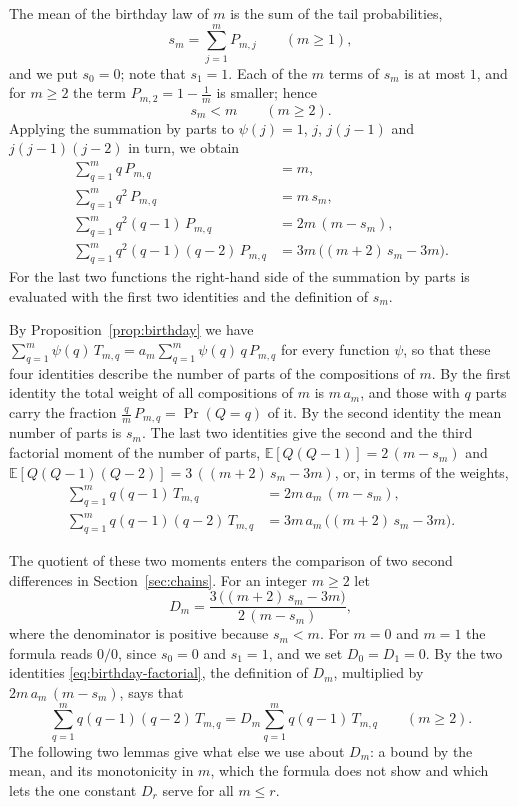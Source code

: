 \documentclass{amsart}
\theoremstyle{definition}
\theoremstyle{remark}
\numberwithin{equation}{section}
\begin{document}
The mean of the birthday law of $m$ is the sum of the tail probabilities,
\[
s_m=\sum_{j=1}^{m}P_{m,j}\qquad(m\ge 1),
\]
and we put $s_0=0$; note that $s_1=1$. Each of the $m$ terms of $s_m$ is at most $1$, and for $m\ge 2$ the term $P_{m,2}=1-\frac1m$ is smaller; hence
\[
s_m<m\qquad(m\ge 2).
\]
Applying the summation by parts to $\psi(j)=1$, $j$, $j(j-1)$ and $j(j-1)(j-2)$ in turn, we obtain
\begin{equation}\label{eq:birthday-moments}
\begin{aligned}
\sum_{q=1}^{m}q\,P_{m,q}&=m,\\
\sum_{q=1}^{m}q^{2}\,P_{m,q}&=m\,s_m,\\
\sum_{q=1}^{m}q^{2}(q-1)\,P_{m,q}&=2m\,(m-s_m),\\
\sum_{q=1}^{m}q^{2}(q-1)(q-2)\,P_{m,q}&=3m\,\bigl((m+2)\,s_m-3m\bigr).
\end{aligned}
\end{equation}
For the last two functions the right-hand side of the summation by parts is evaluated with the first two identities and the definition of $s_m$.

By Proposition~\ref{prop:birthday} we have $\sum_{q=1}^{m}\psi(q)\,T_{m,q}=a_m\sum_{q=1}^{m}\psi(q)\,q\,P_{m,q}$ for every function $\psi$, so that these four identities describe the number of parts of the compositions of $m$. By the first identity the total weight of all compositions of $m$ is $m\,a_m$, and those with $q$ parts carry the fraction $\frac qm\,P_{m,q}=\Pr(Q=q)$ of it. By the second identity the mean number of parts is $s_m$. The last two identities give the second and the third factorial moment of the number of parts, $\mathbb{E}[Q(Q-1)]=2\,(m-s_m)$ and $\mathbb{E}[Q(Q-1)(Q-2)]=3\,((m+2)\,s_m-3m)$, or, in terms of the weights,
\begin{equation}\label{eq:birthday-factorial}
\begin{aligned}
\sum_{q=1}^{m}q(q-1)\,T_{m,q}&=2m\,a_m\,(m-s_m),\\
\sum_{q=1}^{m}q(q-1)(q-2)\,T_{m,q}&=3m\,a_m\,\bigl((m+2)\,s_m-3m\bigr).
\end{aligned}
\end{equation}

The quotient of these two moments enters the comparison of two second differences in Section~\ref{sec:chains}. For an integer $m\ge 2$ let
\[
D_m=\frac{3\,\bigl((m+2)\,s_m-3m\bigr)}{2\,(m-s_m)},
\]
where the denominator is positive because $s_m<m$. For $m=0$ and $m=1$ the formula reads $0/0$, since $s_0=0$ and $s_1=1$, and we set $D_0=D_1=0$. By the two identities \eqref{eq:birthday-factorial}, the definition of $D_m$, multiplied by $2m\,a_m\,(m-s_m)$, says that
\begin{equation}\label{eq:birthday-ratio}
\sum_{q=1}^{m}q(q-1)(q-2)\,T_{m,q}=D_m\sum_{q=1}^{m}q(q-1)\,T_{m,q}\qquad(m\ge 2).
\end{equation}
The following two lemmas give what else we use about $D_m$: a bound by the mean, and its monotonicity in $m$, which the formula does not show and which lets the one constant $D_r$ serve for all $m\le r$.
\end{document}
